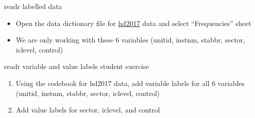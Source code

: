 \documentclass[8pt,ignorenonframetext,dvipsnames]{beamer}
\newenvironment{Shaded}{\begin{snugshade}}{\end{snugshade}}
\newcommand{\KeywordTok}[1]{\textcolor[rgb]{0.13,0.29,0.53}{\textbf{#1}}}
\newcommand{\StringTok}[1]{\textcolor[rgb]{0.31,0.60,0.02}{#1}}
\newcommand{\CommentTok}[1]{\textcolor[rgb]{0.56,0.35,0.01}{\textit{#1}}}
\newcommand{\OperatorTok}[1]{\textcolor[rgb]{0.81,0.36,0.00}{\textbf{#1}}}
\newcommand{\NormalTok}[1]{#1}
\providecommand{\tightlist}{%
  \setlength{\itemsep}{0pt}\setlength{\parskip}{0pt}}
\renewcommand{\textbf}[1]{{\color{darkgray}\bfseries\fontfamily{Montserrat-TOsF}#1}}
\let\olditem\item
\renewcommand{\item}{%
  \olditem\vspace{4pt}
}
\begin{document}
\begin{frame}[fragile]{readr labelled data}

\begin{itemize}
\tightlist
\item
  Open the data dictionary file for
  \href{https://nces.ed.gov/ipeds/datacenter/data/HD2017_Dict.zip}{hd2017}
  data and select ``Frequencies'' sheet
\item
  We are only working with these 6 variables (unitid, instnm, stabbr,
  sector, iclevel, control)
\end{itemize}

\begin{Shaded}
\end{Shaded}

\end{frame}

\begin{frame}{readr variable and value labels student exercise}

\begin{enumerate}
\def\labelenumi{\arabic{enumi}.}
\item
  Using the codebook for hd2017 data, add variable labels for all 6
  variables (unitid, instnm, stabbr, sector, iclevel, control)
\item
  Add value labels for sector, iclevel, and control
\end{enumerate}

\end{frame}
\end{document}
